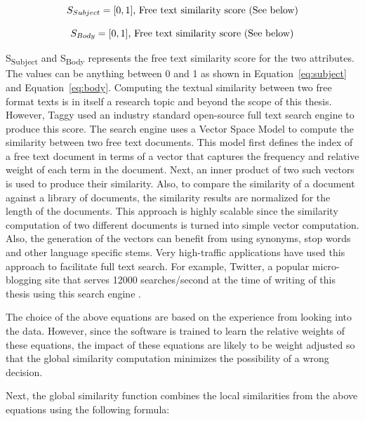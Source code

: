 \begin{equation}
\label{eq:subject}
S_{Subject} = [0, 1]\mbox{, Free text similarity score (See below)}\\
\end{equation}

\begin{equation}
\label{eq:body}
S_{Body} = [0, 1]\mbox{, Free text similarity score (See below)}\\
\end{equation}

S\textsubscript{Subject} and S\textsubscript{Body} represents the free text similarity score for the two attributes. The values can be anything between 0 and 1 as shown in Equation~\ref{eq:subject} and Equation~\ref{eq:body}. Computing the textual similarity between two free format texts is in itself a research topic and beyond the scope of this thesis. However, Taggy used an industry standard open-source full text search engine to produce this score. The search engine uses a Vector Space Model \cite{a_vector_space} to compute the similarity between two free text documents. This model first defines the index of a free text document in terms of a vector that captures the frequency and relative weight of each term in the document. Next, an inner product of two such vectors is used to produce their similarity. Also, to compare the similarity of a document against a library of documents, the similarity results are normalized for the length of the documents. This approach is highly scalable since the similarity computation of two different documents is turned into simple vector computation. Also, the generation of the vectors can benefit from using synonyms, stop words and other language specific stems. Very high-traffic applications have used this approach to facilitate full text search. For example, Twitter, a popular micro-blogging site that serves 12000 searches/second at the time of writing of this thesis using this search engine \cite{twitter_lucene}.

The choice of the above equations are based on the experience from looking into the data. However, since the software is trained to learn the relative weights of these equations, the impact of these equations are likely to be weight adjusted so that the global similarity computation minimizes the possibility of a wrong decision.

Next, the global similarity function combines the local similarities from the above equations using the following formula:


